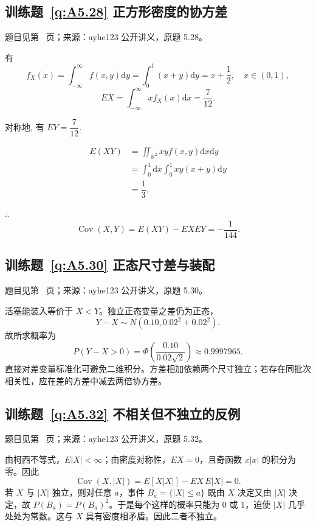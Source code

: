 \subsection*{训练题~\ref{q:A5.28} 正方形密度的协方差}\label{a:A5.28}{\small 题目见第~\pageref{q:A5.28} 页；来源：ayhe123 公开讲义，原题 5.28。}
\begin{solve}
    有
    \[f_X(x)=\int_{-\infty}^\infty f(x,y)\mathrm{d}y=\int_0^1(x+y)\mathrm{d}y=x+\dfrac{1}{2},\quad x\in(0,1),\]
    \[EX=\int_{-\infty}^\infty xf_X(x)\mathrm{d}x=\dfrac{7}{12}.\]

    对称地, 有 $EY=\dfrac{7}{12}$.

    \[\begin{aligned}E(XY)&=\iint_{\mathbb{R}^2}xyf(x,y)\mathrm{d}x\mathrm{d}y\\&=\int_0^1\mathrm{d}x\int_0^1xy(x+y)\mathrm{d}y\\&=\dfrac{1}{3}.\end{aligned}\]

    $\therefore$
    \[\operatorname{Cov}(X,Y)=E(XY)-EXEY=-\dfrac{1}{144}.\]
\end{solve}

\subsection*{训练题~\ref{q:A5.30} 正态尺寸差与装配}\label{a:A5.30}{\small 题目见第~\pageref{q:A5.30} 页；来源：ayhe123 公开讲义，原题 5.30。}
\begin{solve}活塞能装入等价于 $X<Y$。独立正态变量之差仍为正态，\[Y-X\sim N(0.10,0.02^2+0.02^2).\]故所求概率为\[P(Y-X>0)=\Phi\left(\frac{0.10}{0.02\sqrt2}\right)\approx0.9997965.\]直接对差变量标准化可避免二维积分。方差相加依赖两个尺寸独立；若存在同批次相关性，应在差的方差中减去两倍协方差。\end{solve}

\subsection*{训练题~\ref{q:A5.32} 不相关但不独立的反例}\label{a:A5.32}{\small 题目见第~\pageref{q:A5.32} 页；来源：ayhe123 公开讲义，原题 5.32。}
\begin{solve}由柯西不等式，$E|X|<\infty$；由密度对称性，$EX=0$，且奇函数 $x|x|$ 的积分为零。因此\[\operatorname{Cov}(X,|X|)=E[X|X|]-EX\,E|X|=0.\]若 $X$ 与 $|X|$ 独立，则对任意 $a$，事件 $B_a=\{|X|\le a\}$ 既由 $X$ 决定又由 $|X|$ 决定，故 $P(B_a)=P(B_a)^2$。于是每个这样的概率只能为 $0$ 或 $1$，迫使 $|X|$ 几乎处处为常数。这与 $X$ 具有密度相矛盾。因此二者不独立。\end{solve}

